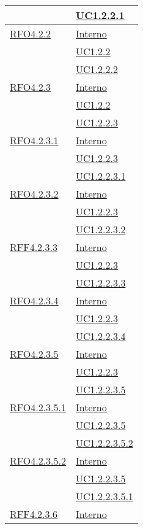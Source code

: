 \begin{longtable}{|>{\centering}m{5cm}|m{5cm}<{\centering}|}
& \hyperref[UC1.2.2.1]{UC1.2.2.1}\\ \hline
\hyperlink{RFO4.2.2}{RFO4.2.2} & \hyperlink{Interno}{Interno}\\
& \hyperref[UC1.2.2]{UC1.2.2}\\
& \hyperref[UC1.2.2.2]{UC1.2.2.2}\\ \hline
\hyperlink{RFO4.2.3}{RFO4.2.3} & \hyperlink{Interno}{Interno}\\
& \hyperref[UC1.2.2]{UC1.2.2}\\
& \hyperref[UC1.2.2.3]{UC1.2.2.3}\\ \hline
\hyperlink{RFO4.2.3.1}{RFO4.2.3.1} & \hyperlink{Interno}{Interno}\\
& \hyperref[UC1.2.2.3]{UC1.2.2.3}\\
& \hyperref[UC1.2.2.3.1]{UC1.2.2.3.1}\\ \hline
\hyperlink{RFO4.2.3.2}{RFO4.2.3.2} & \hyperlink{Interno}{Interno}\\
& \hyperref[UC1.2.2.3]{UC1.2.2.3}\\
& \hyperref[UC1.2.2.3.2]{UC1.2.2.3.2}\\ \hline
\hyperlink{RFF4.2.3.3}{RFF4.2.3.3} & \hyperlink{Interno}{Interno}\\
& \hyperref[UC1.2.2.3]{UC1.2.2.3}\\
& \hyperref[UC1.2.2.3.3]{UC1.2.2.3.3}\\ \hline
\hyperlink{RFO4.2.3.4}{RFO4.2.3.4} & \hyperlink{Interno}{Interno}\\
& \hyperref[UC1.2.2.3]{UC1.2.2.3}\\
& \hyperref[UC1.2.2.3.4]{UC1.2.2.3.4}\\ \hline
\hyperlink{RFO4.2.3.5}{RFO4.2.3.5} & \hyperlink{Interno}{Interno}\\
& \hyperref[UC1.2.2.3]{UC1.2.2.3}\\
& \hyperref[UC1.2.2.3.5]{UC1.2.2.3.5}\\ \hline
\hyperlink{RFO4.2.3.5.1}{RFO4.2.3.5.1} & \hyperlink{Interno}{Interno}\\
& \hyperref[UC1.2.2.3.5]{UC1.2.2.3.5}\\
& \hyperref[UC1.2.2.3.5.2]{UC1.2.2.3.5.2}\\ \hline
\hyperlink{RFO4.2.3.5.2}{RFO4.2.3.5.2} & \hyperlink{Interno}{Interno}\\
& \hyperref[UC1.2.2.3.5]{UC1.2.2.3.5}\\
& \hyperref[UC1.2.2.3.5.1]{UC1.2.2.3.5.1}\\ \hline
\hyperlink{RFF4.2.3.6}{RFF4.2.3.6} & \hyperlink{Interno}{Interno}\\

\end{longtable}
